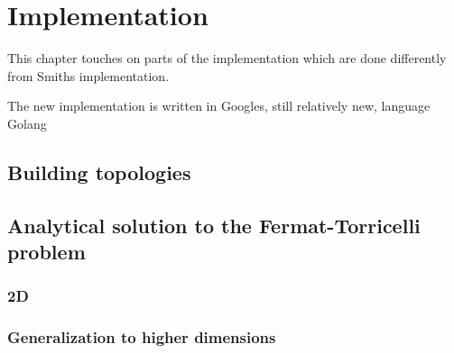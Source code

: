  {
\abnormalparskip{0pt}
\chapter{Implementation}
\label{cha:implementation}
}

This chapter touches on parts of the implementation which are done differently
from Smiths implementation.

The new implementation is written in Googles, still relatively new, language
Golang~\cite{GolangHomepage}

\section{Building topologies}
\label{sec:building-topologies}

\section{Analytical solution to the Fermat-Torricelli problem}
\label{sec:analyt-solut-ferm}

\subsection{2D}
\label{sec:2d}

\subsection{Generalization to higher dimensions}
\label{sec:gener-high-dimens}


\chapterbreak{}

